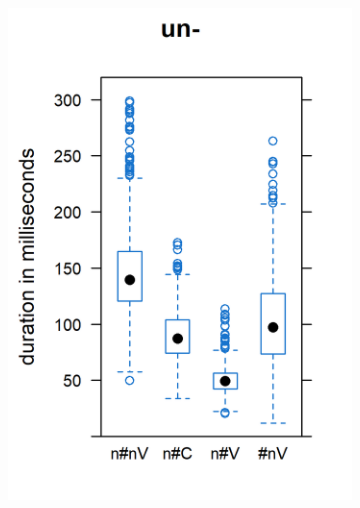 \begin{figure}[h!]
	
	\begin{subfigure}
		\centering
		\includegraphics[scale=.55]{images/Experiment/boxUn}
	\end{subfigure}%
	~
	\begin{subfigure}
		\centering

\end{subfigure}
\end{figure}
